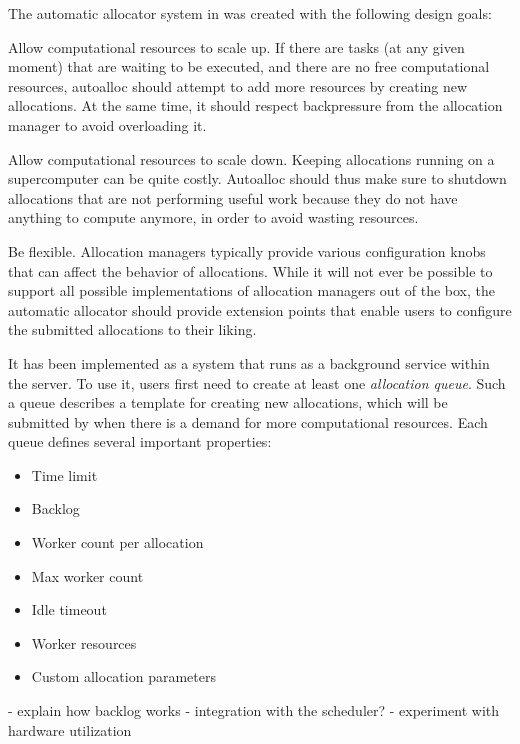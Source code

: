 The automatic allocator system in \hyperqueue{} was created with the following design goals:
\begin{description}
	\item Allow computational resources to scale up. If there are tasks (at any given moment)
	that are waiting to be executed, and there are no free computational resources, autoalloc should
	attempt to add more resources by creating new allocations. At the same time, it should
	respect backpressure from the allocation manager to avoid overloading it.
	\item Allow computational resources to scale down. Keeping allocations running on a
	supercomputer can be quite costly. Autoalloc should thus make sure to shutdown allocations
	that are not performing useful work because they do not have anything to compute anymore,
	in order to avoid wasting resources.
	\item Be flexible. Allocation managers typically provide various configuration knobs that
	can affect the behavior of allocations. While it will not ever be possible to support all
	possible implementations of allocation managers out of the box, the automatic allocator should
	provide extension points that enable users to configure the submitted allocations to their
	liking.
\end{description}

It has been implemented as a system that runs as a background service within the \hyperqueue{}
server. To use it, users first need to create at least one \emph{allocation queue}. Such a
queue describes a template for creating new allocations, which will be submitted by \hq{} when
there is a demand for more computational resources. Each queue defines several important properties:

\begin{itemize}
	\item Time limit
	\item Backlog
	\item Worker count per allocation
	\item Max worker count
	\item Idle timeout
	\item Worker resources
	\item Custom allocation parameters
\end{itemize}


- explain how backlog works
- integration with the scheduler?
- experiment with hardware utilization

